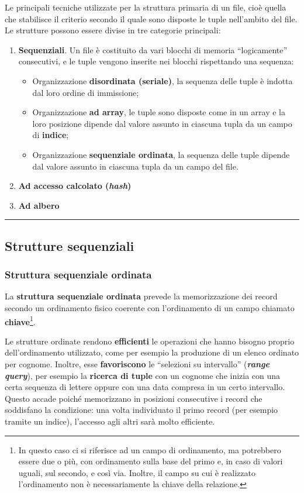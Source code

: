 \documentclass[a4paper]{article}
\newcommand{\longline}{\noindent\rule{\textwidth}{0.4pt}}
\newcommand{\dquotes}[1]{``#1''}
\begin{document}
	Le principali tecniche utilizzate per la struttura primaria di un file, cioè quella che stabilisce il criterio secondo il quale sono disposte le tuple nell'ambito del file.
	Le strutture possono essere divise in tre categorie principali:
	\begin{enumerate}
		\item \textbf{Sequenziali}. Un file è costituito da vari blocchi di memoria \dquotes{logicamente} consecutivi, e le tuple vengono inserite nei blocchi rispettando una sequenza:
		\begin{itemize}
			\item Organizzazione \textbf{disordinata (seriale)}, la sequenza delle tuple è indotta dal loro ordine di immissione;
			\item Organizzazione \textbf{ad array}, le tuple sono disposte come in un array e la loro posizione dipende dal valore assunto in ciascuna tupla da un campo di \textbf{indice};
			\item Organizzazione \textbf{sequenziale ordinata}, la sequenza delle tuple dipende dal valore assunto in ciascuna tupla da un campo del file.
		\end{itemize}
		\item \textbf{Ad accesso calcolato (\emph{hash})}
		\item \textbf{Ad albero}
	\end{enumerate}

	\longline

	\subsection{Strutture sequenziali}

	\subsubsection{Struttura sequenziale ordinata}

	La \textcolor{Red3}{\textbf{struttura sequenziale ordinata}} prevede la memorizzazione dei record secondo un ordinamento fisico coerente con l'ordinamento di un campo chiamato \textbf{chiave}\footnote{In questo caso ci si riferisce ad un campo di ordinamento, ma potrebbero essere due o più, con ordinamento sulla base del primo e, in caso di valori uguali, sul secondo, e così via. Inoltre, il campo su cui è realizzato l'ordinamento non è necessariamente la chiave della relazione.}.\newline

	\noindent
	Le strutture ordinate rendono \textbf{efficienti} le operazioni che hanno bisogno proprio dell'ordinamento utilizzato, come per esempio la produzione di un elenco ordinato per cognome.
	Inoltre, esse \textbf{favoriscono} le \dquotes{selezioni su intervallo} (\textbf{\emph{range query}}), per esempio la \textbf{ricerca di tuple} con un cognome che inizia con una certa sequenza di lettere oppure con una data compresa in un certo intervallo.
	Questo accade poiché memorizzano in posizioni consecutive i record che soddisfano la condizione: una volta individuato il primo record (per esempio tramite un indice), l'accesso agli altri sarà molto efficiente.\newline
\end{document}
